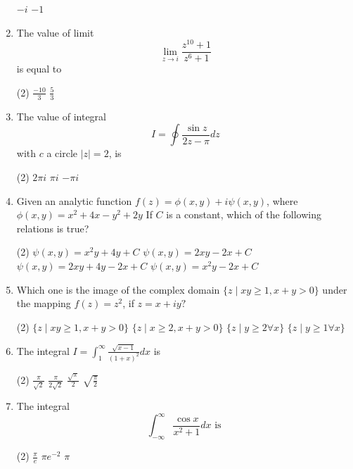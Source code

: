 \begin{note}
\begin{enumerate}[label=\color{ocre}\textbf{\arabic*.}]
\begin{tasks}
	\task[\textbf{c.}]$-i$
	\task[\textbf{d.}] $-1$
\end{tasks}
\item The value of limit
$$
\lim _{z \rightarrow i} \frac{z^{10}+1}{z^{6}+1}
$$
is equal to
{}
\begin{tasks}(2)
	\task[\textbf{c.}] $\frac{-10}{3}$
	\task[\textbf{d.}] $\frac{5}{3}$
\end{tasks}
\item The value of integral
$$
I=\oint \frac{\sin z}{2 z-\pi} d z
$$
with $c$ a circle $|z|=2$, is
{}
\begin{tasks}(2)
	\task[\textbf{b.}]$2 \pi i$
	\task[\textbf{c.}] $\pi i$
	\task[\textbf{d.}]  $-\pi i$
\end{tasks}
\item Given an analytic function $f(z)=\phi(x, y)+i \psi(x, y)$, where $\phi(x, y)=x^{2}+4 x-y^{2}+2 y$
If $C$ is a constant, which of the following relations is true?
{}
\begin{tasks}(2)
	\task[\textbf{a.}]$\psi(x, y)=x^{2} y+4 y+C$
	\task[\textbf{b.}]$\psi(x, y)=2 x y-2 x+C$
	\task[\textbf{c.}]$\psi(x, y)=2 x y+4 y-2 x+C$
	\task[\textbf{d.}] $\psi(x, y)=x^{2} y-2 x+C$
\end{tasks}
\item Which one is the image of the complex domain $\{z \mid x y \geq 1, x+y>0\}$ under the mapping $f(z)=z^{2}$, if $z=x+i y ?$
{}
\begin{tasks}(2)
	\task[\textbf{a.}] $\{z \mid x y \geq 1, x+y>0\}$
	\task[\textbf{b.}]$\{z \mid x \geq 2, x+y>0\}$
	\task[\textbf{c.}]$\{z \mid y \geq 2 \forall x\}$
	\task[\textbf{d.}] $\{z \mid y \geq 1 \forall x\}$
\end{tasks}
\item The integral $I=\int_{1}^{\infty} \frac{\sqrt{x-1}}{(1+x)^{2}} d x$ is
{}
\begin{tasks}(2)
	\task[\textbf{a.}]$\frac{\pi}{\sqrt{2}}$
	\task[\textbf{b.}]$\frac{\pi}{2 \sqrt{2}}$
	\task[\textbf{c.}]$\frac{\sqrt{\pi}}{2}$
	\task[\textbf{d.}]$\sqrt{\frac{\pi}{2}}$
\end{tasks}
\item The integral
$$
\int_{-\infty}^{\infty} \frac{\cos x}{x^{2}+1} d x \text { is }
$$
{}
\begin{tasks}(2)
	\task[\textbf{a.}]$\frac{\pi}{e}$
	\task[\textbf{b.}] $\pi e^{-2}$
	\task[\textbf{c.}]$\pi$

\end{tasks}
\end{enumerate}
\end{note}
